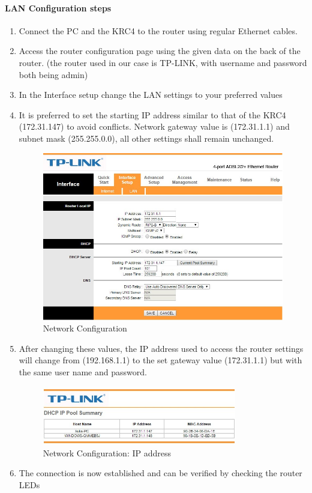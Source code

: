 	\paragraph{LAN Configuration steps}
	\begin{enumerate}
		\item Connect the PC and the KRC4 to the router using regular Ethernet cables.
		\item Access the router configuration page using the given data on the back of the router. (the router used in our case is TP-LINK, with username and password both being admin)
		\item In the Interface setup change the LAN settings to your preferred values
		\item It is preferred to set the starting IP address similar to that of the KRC4 (172.31.147) to avoid conflicts. Network gateway value is (172.31.1.1) and subnet mask (255.255.0.0), all other settings shall remain unchanged.
		\begin{figure}[H]
            \centering
            \includegraphics[width=\textwidth]{figures/network1}
            \caption{Network Configuration}
            \label{fig:network1}
        \end{figure}

		\item After changing these values, the IP address used to access the router settings will change from (192.168.1.1) to the set gateway value (172.31.1.1) but with the same user name and password.
        
	\begin{figure}[H]
    \centering
    \includegraphics[width=0.8\textwidth]{figures/network2}
    \caption{Network Configuration:  IP address}
    \label{fig:network2}
\end{figure}
    
    \item The connection is now established and can be verified by checking the router LEDs
	\end{enumerate}

